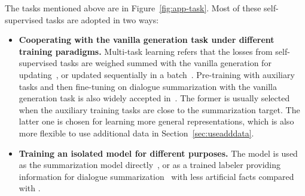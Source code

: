 The tasks mentioned above are in Figure~\ref{fig:app-task}. Most of these self-supervised tasks are adopted in two ways:
\begin{itemize}
	\item \textbf{Cooperating with the vanilla generation task under 
different training paradigms.}	
{Multi-task learning refers that the losses from self-supervised tasks are weighed summed with the vanilla generation for updating}~\cite{zhao2021give,fuzw20}, or updated sequentially in a batch~\cite{liu2021topic}. 
Pre-training with auxiliary tasks and then fine-tuning on dialogue summarization with the vanilla generation task is also widely accepted in~\cite{khalifa2021bag,qi2021improving}. 
The former is usually selected when the auxiliary training tasks are close to the summarization target. 
The latter one is chosen for learning more general representations, which is also more flexible to use additional data in Section~\ref{sec:useadddata}. %
	\item \textbf{Training an isolated model for different purposes.} 
The model is used as the summarization model directly~\cite{zou2021unsupervised, feigenblat-etal-2021-tweetsumm-dialog}, or as a trained labeler providing information for dialogue summarization~\cite{feigenblat-etal-2021-tweetsumm-dialog} with less artificial facts compared with \citet{feng2021language}. %
	
	

\end{itemize}


